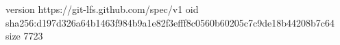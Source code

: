 version https://git-lfs.github.com/spec/v1
oid sha256:d197d326a64b1463f984b9a1e82f3efff8c0560b60205c7c9de18b44208b7c64
size 7723

